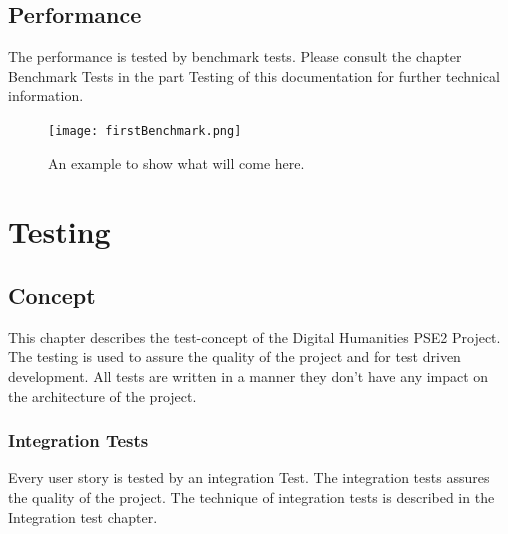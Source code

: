 \documentclass[11pt,fleqn,openany]{book} %
\begin{document}


\chapter{Performance}

The performance is tested by benchmark tests. Please consult the chapter Benchmark Tests in the part Testing of this documentation for further technical information.

\begin{figure}[h!]
  \caption{An example to show what will come here.}
  \centering
    \texttt{[image: firstBenchmark.png]}
\end{figure}



\part{Testing}



\chapter{Concept}
This chapter describes the test-concept of the Digital Humanities PSE2 Project. The testing is used to assure the quality of the project and for test driven development. All tests are written in a manner they don't have any impact on the architecture of the project. 

\section*{Integration Tests}
Every user story is tested by an integration Test. The integration tests assures the quality of the project. The technique of integration tests is described in the Integration test chapter. 
\end{document}
